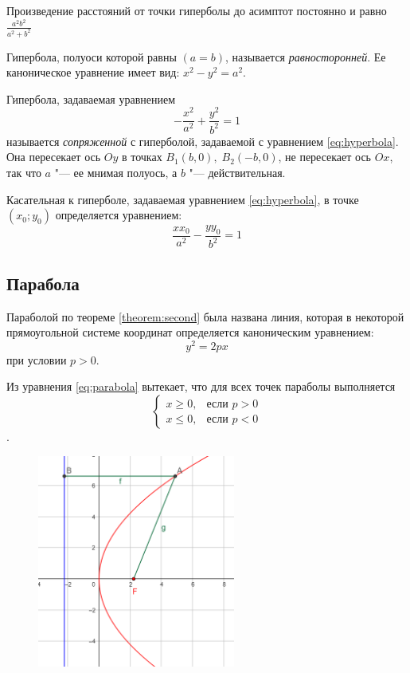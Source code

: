 Произведение расстояний от точки гиперболы до асимптот постоянно и равно $\frac{a^2b^2}{a^2 + b^2}$

Гипербола, полуоси которой равны $(a = b)$, называется \textit{равносторонней}. Ее каноническое уравнение имеет вид: $x^2 - y^2 = a^2$.

\begin{definition}
  Гипербола, задаваемая уравнением
  $$
    -\frac{x^2}{a^2} + \frac{y^2}{b^2} = 1
  $$
  называется \textit{сопряженной} с гиперболой, задаваемой с уравнением \ref{eq:hyperbola}. Она пересекает ось $Oy$ в точках $B_1(b,0), \; B_2(-b, 0)$, не пересекает ось $Ox$, так что $a$ "--- ее мнимая полуось, а $b$ "--- действительная.
\end{definition}

Касательная к гиперболе, задаваемая уравнением \ref{eq:hyperbola}, в точке $(x_0; y_0)$ определяется уравнением:
$$
  \frac{xx_0}{a^2} - \frac{yy_0}{b^2} = 1
$$

\subsection*{Парабола}
Параболой по теореме \ref{theorem:second} была названа линия, которая в некоторой прямоугольной системе координат определяется каноническим уравнением:
\begin{equation}
  \label{eq:parabola}
  y^2 = 2px
\end{equation} при условии $p > 0$.

Из уравнения \ref{eq:parabola} вытекает, что для всех точек параболы выполняется $$\begin{cases}
  x \geq 0,& \text{если } p > 0 \\
  x \leq 0,& \text{если } p < 0
\end{cases}$$.
\begin{figure}[H]
  \centering
  \includegraphics[height = 7cm]{images/second_parabola.png}
  \label{fig:parabola}
\end{figure}

